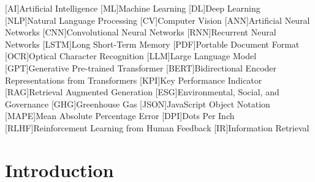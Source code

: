 \documentclass[english, 12pt, a4paper, elec, utf8, a-2b, online]{aaltothesis}
\begin{document}
[AI]{Artificial Intelligence}
[ML]{Machine Learning}
[DL]{Deep Learning}
[NLP]{Natural Language Processing}
[CV]{Computer Vision}
[ANN]{Artificial Neural Networks}
[CNN]{Convolutional Neural Networks}
[RNN]{Recurrent Neural Networks}
[LSTM]{Long Short-Term Memory}
[PDF]{Portable Document Format}
[OCR]{Optical Character Recognition}
[LLM]{Large Language Model}
[GPT]{Generative Pre-trained Transformer}
[BERT]{Bidirectional Encoder Representations from Transformers}
[KPI]{Key Performance Indicator}
[RAG]{Retrieval Augmented Generation}
[ESG]{Environmental, Social, and Governance}
[GHG]{Greenhouse Gas}
[JSON]{JavaScript Object Notation}
[MAPE]{Mean Absolute Percentage Error}
[DPI]{Dots Per Inch}
[RLHF]{Reinforcement Learning from Human Feedback}
[IR]{Information Retrieval}

\begin{acronym}
\end{acronym}


\newpage
\section{Introduction}
\label{sec:intro}
\end{document}
